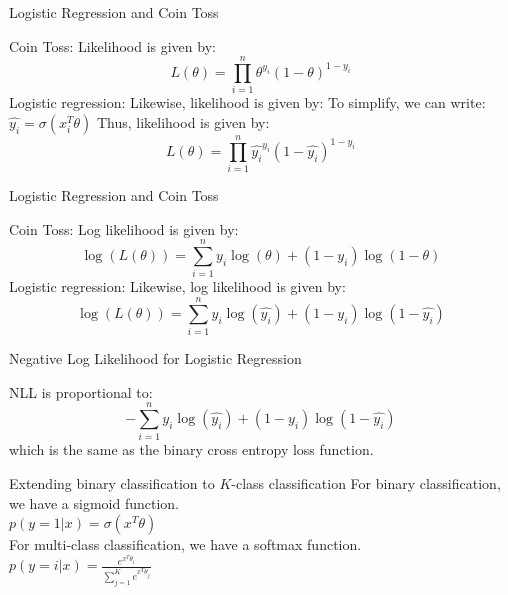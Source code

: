 \documentclass{beamer}
\begin{document}
\begin{frame}{Logistic Regression and Coin Toss}

    Coin Toss: Likelihood is given by:
    $$L(\theta) = \prod_{i=1}^n \theta^{y_i}(1-\theta)^{1-y_i}$$
    \vspace{10pt}
    \pause 
    Logistic regression: Likewise, likelihood is given by:
    \pause To simplify, we can write: $\hat{y_i} = \sigma(x_i^T\theta)$
    \pause Thus, likelihood is given by:
    $$L(\theta) = \prod_{i=1}^n \hat{y_i}^{y_i}(1-\hat{y_i})^{1-y_i}$$
\end{frame}

\begin{frame}{Logistic Regression and Coin Toss}

    Coin Toss: Log likelihood is given by:
    $$\log(L(\theta)) = \sum_{i=1}^n y_i\log(\theta) + (1-y_i)\log(1-\theta)$$
    \vspace{10pt}
    \pause 
    Logistic regression: Likewise, log likelihood is given by:
    $$\log(L(\theta)) = \sum_{i=1}^n y_i\log(\hat{y_i}) + (1-y_i)\log(1-\hat{y_i})$$
\end{frame}

\begin{frame}{Negative Log Likelihood for Logistic Regression}
    \begin{tcolorbox}[colback=metropolisblue!5,colframe=metropolisblue,title=Negative Log Likelihood for Logistic Regression]
        NLL is proportional to:
        \begin{equation*}
            -\sum_{i=1}^n y_i\log(\hat{y_i}) + (1-y_i)\log(1-\hat{y_i})
        \end{equation*}
        which is the same as the binary cross entropy loss function.
    \end{tcolorbox}
    
\end{frame}

\begin{frame}{Extending binary classification to $K$-class classification}
    For binary classification, we have a sigmoid function.\\
    $p(y=1|x) = \sigma(x^T\theta)$\\
    \vspace{10pt}
    \pause For multi-class classification, we have a softmax function.\\
    $p(y=i|x) = \frac{e^{x^T\theta_i}}{\sum_{j=1}^Ke^{x^T\theta_j}}$\\

    
    
\end{frame}
\end{document}
